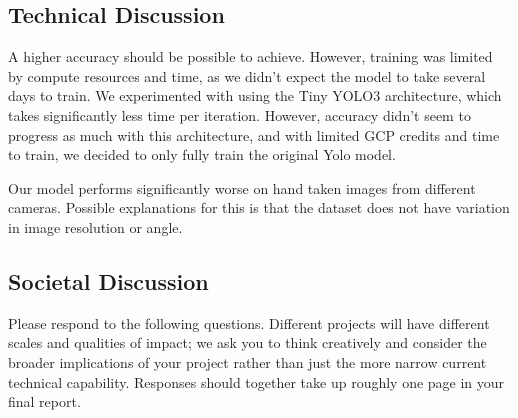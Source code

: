 \documentclass[10pt,twocolumn,letterpaper]{article}
\begin{document}
\subsection{Technical Discussion}

A higher accuracy should be possible to achieve. However, training was limited by compute resources and time, as we didn't expect the model to take several days to train. We experimented with using the Tiny YOLO3 architecture, which takes significantly less time per iteration. However, accuracy didn't seem to progress as much with this architecture, and with limited GCP credits and time to train, we decided to only fully train the original Yolo model. 

Our model performs significantly worse on hand taken images from different cameras. Possible explanations for this is that the dataset does not have variation in image resolution or angle. 


\subsection{Societal Discussion}

Please respond to the following questions. Different projects will have different scales and qualities of impact; we ask you to think creatively and consider the broader implications of your project rather than just the more narrow current technical capability. Responses should together take up roughly one page in your final report.
\end{document}
